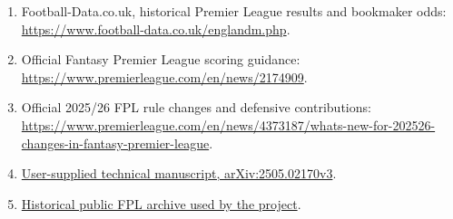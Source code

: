 \documentclass[11pt,a4paper]{article}
\begin{document}
\begin{enumerate}
  \item Football-Data.co.uk, historical Premier League results and bookmaker odds: \url{https://www.football-data.co.uk/englandm.php}.
  \item Official Fantasy Premier League scoring guidance: \url{https://www.premierleague.com/en/news/2174909}.
  \item Official 2025/26 FPL rule changes and defensive contributions: \url{https://www.premierleague.com/en/news/4373187/whats-new-for-202526-changes-in-fantasy-premier-league}.
  \item \href{https://arxiv.org/html/2505.02170v3}{User-supplied technical manuscript, arXiv:2505.02170v3}.
  \item \href{https://github.com/vaastav/Fantasy-Premier-League}{Historical public FPL archive used by the project}.
\end{enumerate}
\end{document}
